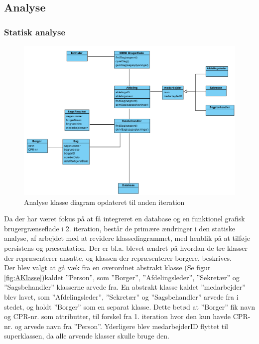 \subsection{Analyse}

\subsubsection{Statisk analyse}
\begin{figure}[htb!]
  \includegraphics[scale = 0.7]{./PNG/analyse/analyseklassediagramOpdateret.PNG} 
  \caption{Analyse klasse diagram opdateret til anden iteration}
  \label{fig:2analyseklasse}
\end{figure}
Da der har været fokus på at få integreret en database og en funktionel grafisk brugergrænseflade i 2. iteration, består de primære ændringer i den statiske analyse, af arbejdet med at revidere klassediagrammet, med henblik på at tilføje persistens og præsentation. Der er bl.a. blevet ændret på hvordan de tre klasser der repræsenterer ansatte, og klassen der repræsenterer borgere, beskrives. \\
Der blev valgt at gå væk fra en overordnet abstrakt klasse (Se figur \ref{fig:AKlasse})kaldet ”Person”, som ”Borger”, ”Afdelingsleder”, ”Sekretær” og ”Sagsbehandler” klasserne arvede fra. En abstrakt klasse kaldet ”medarbejder” blev lavet, som ”Afdelingsleder”, ”Sekretær” og ”Sagsbehandler” arvede fra i stedet, og holdt ”Borger” som en separat klasse. Dette betød at ”Borger” fik navn og CPR-nr. som attributter, til forskel fra 1. iteration hvor den kun havde CPR-nr. og arvede navn fra ”Person”. Yderligere blev medarbejderID flyttet til superklassen, da alle arvende klasser skulle bruge den. \\
